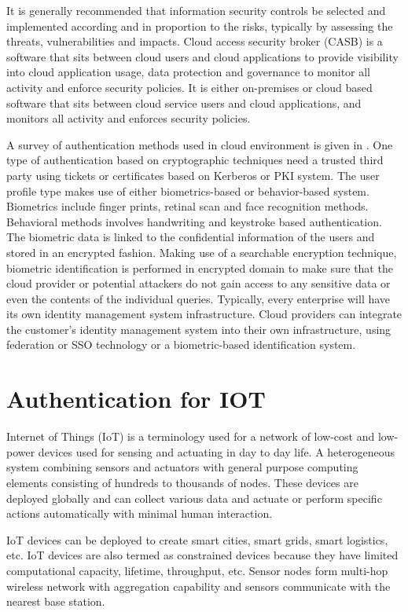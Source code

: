 \begin{multicols}{2}
It is generally recommended that information security controls be selected and implemented according and in proportion to the risks, typically by assessing the threats, vulnerabilities and impacts. Cloud access security broker (CASB) is a software that sits between cloud users and cloud applications to provide visibility into cloud application usage, data protection and governance to monitor all activity and enforce security policies. It is either on-premises or cloud based software that sits between cloud service users and cloud applications, and monitors all activity and enforces security policies. 

A survey of authentication methods used in cloud environment is given in \cite{key18}. One type of authentication based on cryptographic techniques need a trusted third party using tickets or certificates based on Kerberos or PKI system. The user profile type makes use of either biometrics-based or behavior-based system. Biometrics include finger prints, retinal scan and face recognition methods. Behavioral methods involves handwriting and keystroke based authentication. The biometric data is linked to the confidential information of the users and stored in an encrypted fashion. Making use of a searchable encryption technique, biometric identification is performed in encrypted domain to make sure that the cloud provider or potential attackers do not gain access to any sensitive data or even the contents of the individual queries. Typically, every enterprise will have its own identity management system infrastructure. Cloud providers can integrate the customer's identity management system into their own infrastructure, using federation or SSO technology or a biometric-based identification system.

\section*{Authentication for IOT}

Internet of Things (IoT) is a terminology used for a network of low-cost and low-power devices used for sensing and actuating in day to day life. A heterogeneous system combining sensors and actuators with general purpose computing elements consisting of hundreds to thousands of nodes. These devices are deployed globally and can collect various data and actuate or perform specific actions automatically with minimal human interaction.

IoT devices can be deployed to create smart cities, smart grids, smart logistics, etc. IoT devices are also termed as constrained devices because they have limited computational capacity, lifetime, throughput, etc. Sensor nodes form multi-hop wireless network with aggregation capability and sensors communicate with the nearest base station. 


\end{multicols}
